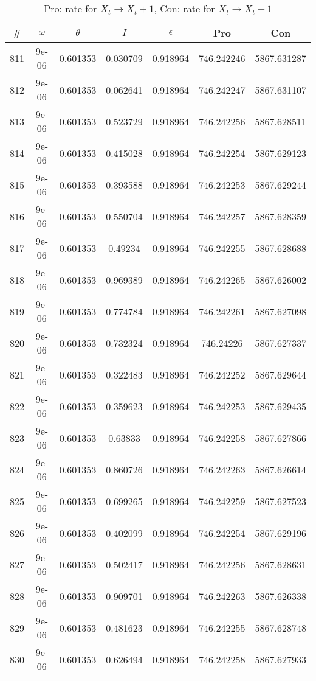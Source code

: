 \newpage
\begin{table}
\caption{Pro: rate for $X_t \rightarrow X_t + 1$, Con: rate for $X_t \rightarrow X_t - 1$}
\begin{tabular*}{\linewidth}{c|c|c|c|c|c|c}
\# & $\omega$ & $\theta$ & $I$ & $\epsilon$ & Pro & Con \\
\hline
811 & 9e-06 & 0.601353 & 0.030709 & 0.918964 & 746.242246 & 5867.631287\\
812 & 9e-06 & 0.601353 & 0.062641 & 0.918964 & 746.242247 & 5867.631107\\
813 & 9e-06 & 0.601353 & 0.523729 & 0.918964 & 746.242256 & 5867.628511\\
814 & 9e-06 & 0.601353 & 0.415028 & 0.918964 & 746.242254 & 5867.629123\\
815 & 9e-06 & 0.601353 & 0.393588 & 0.918964 & 746.242253 & 5867.629244\\
816 & 9e-06 & 0.601353 & 0.550704 & 0.918964 & 746.242257 & 5867.628359\\
817 & 9e-06 & 0.601353 & 0.49234 & 0.918964 & 746.242255 & 5867.628688\\
818 & 9e-06 & 0.601353 & 0.969389 & 0.918964 & 746.242265 & 5867.626002\\
819 & 9e-06 & 0.601353 & 0.774784 & 0.918964 & 746.242261 & 5867.627098\\
820 & 9e-06 & 0.601353 & 0.732324 & 0.918964 & 746.24226 & 5867.627337\\
821 & 9e-06 & 0.601353 & 0.322483 & 0.918964 & 746.242252 & 5867.629644\\
822 & 9e-06 & 0.601353 & 0.359623 & 0.918964 & 746.242253 & 5867.629435\\
823 & 9e-06 & 0.601353 & 0.63833 & 0.918964 & 746.242258 & 5867.627866\\
824 & 9e-06 & 0.601353 & 0.860726 & 0.918964 & 746.242263 & 5867.626614\\
825 & 9e-06 & 0.601353 & 0.699265 & 0.918964 & 746.242259 & 5867.627523\\
826 & 9e-06 & 0.601353 & 0.402099 & 0.918964 & 746.242254 & 5867.629196\\
827 & 9e-06 & 0.601353 & 0.502417 & 0.918964 & 746.242256 & 5867.628631\\
828 & 9e-06 & 0.601353 & 0.909701 & 0.918964 & 746.242263 & 5867.626338\\
829 & 9e-06 & 0.601353 & 0.481623 & 0.918964 & 746.242255 & 5867.628748\\
830 & 9e-06 & 0.601353 & 0.626494 & 0.918964 & 746.242258 & 5867.627933\\

\end{tabular*}
\end{table}
